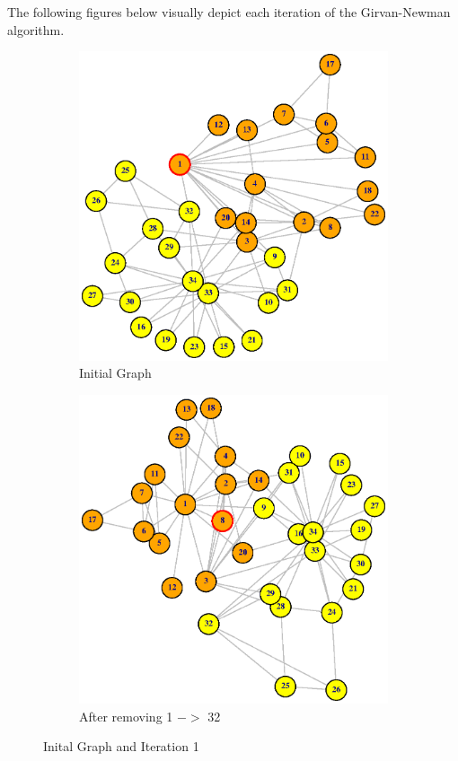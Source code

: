 \documentclass[12pt,letterpaper]{article}
\begin{document}
\newpage 
The following figures below visually depict each iteration of the Girvan-Newman algorithm. \\ 
\begin{figure}
\centering
\begin{subfigure}{.5\textwidth}
  \centering
  \includegraphics[width=.9\linewidth]{Plot1}
  \caption{Initial Graph}
  \label{fig:sub1}
\end{subfigure}%
\begin{subfigure}{.5\textwidth}
  \centering
  \includegraphics[width=.9\linewidth]{Plot2}
  \caption{After removing 1 $->$ 32}
  \label{fig:sub2}
\end{subfigure}
\caption{Inital Graph and Iteration 1}
\label{fig:test}
\end{figure}
\end{document}
